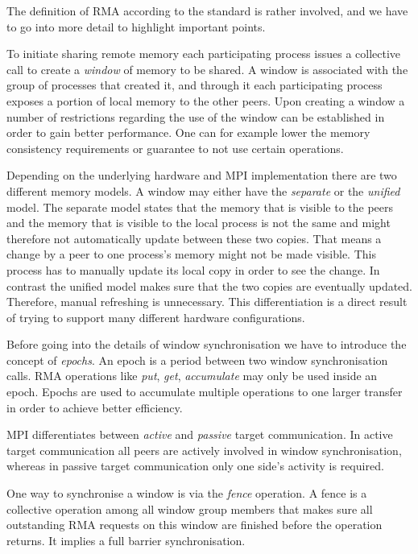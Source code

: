 \documentclass[a4paper, 10pt]{article}
\begin{document}
The definition of RMA according to the standard is rather involved, and we have to go into more detail to highlight important points.

To initiate sharing remote memory each participating process issues a collective call to create a \emph{window} of memory to be shared. A window is associated with the group of processes that created it, and through it each participating process exposes a portion of local memory to the other peers.
Upon creating a window a number of restrictions regarding the use of the window can be established in order to gain better performance. One can for example lower the memory consistency requirements or guarantee to not use certain operations.

Depending on the underlying hardware and MPI implementation there are two different memory models. A window may either have the \emph{separate} or the \emph{unified} model. The separate model states that the memory that is visible to the peers and the memory that is visible to the local process is not the same and might therefore not automatically update between these two copies. That means a change by a peer to one process's memory might not be made visible. This process has to manually update its local copy in order to see the change. In contrast the unified model makes sure that the two copies are eventually updated. Therefore, manual refreshing is unnecessary. This differentiation is a direct result of trying to support many different hardware configurations.

Before going into the details of window synchronisation we have to introduce the concept of \emph{epochs}. An epoch is a period between two window synchronisation calls. RMA operations like \emph{put}, \emph{get}, \emph{accumulate} may only be used inside an epoch. Epochs are used to accumulate multiple operations to one larger transfer in order to achieve better efficiency.

MPI differentiates between \emph{active} and \emph{passive} target communication. In active target communication all peers are actively involved in window synchronisation, whereas in passive target communication only one side's activity is required.

One way to synchronise a window is via the \emph{fence} operation. A fence is a collective operation among all window group members that makes sure all outstanding RMA requests on this window are finished before the operation returns. It implies a full barrier synchronisation.
\end{document}
